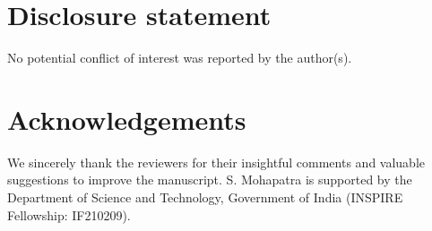 \documentclass[12pt,a4paper]{article}
\begin{document}
 \section*{Disclosure statement}
  No potential conflict of interest was reported by the author(s).


 
\section*{Acknowledgements}
 We sincerely thank the reviewers for their insightful comments and valuable suggestions to improve the manuscript. 
S. Mohapatra is supported by the Department of Science and Technology, Government of India (INSPIRE Fellowship: IF210209).




\end{document}
